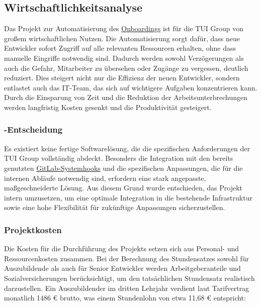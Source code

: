 \subsection{Wirtschaftlichkeitsanalyse}
\label{sec:Wirtschaftlichkeitsanalyse}

Das Projekt zur Automatisierung des \hyperlink{Onboarding}{\textcolor{AOBlau}{Onboardings}} ist für die TUI Group von großem wirtschaftlichen Nutzen. Die Automatisierung sorgt dafür, dass neue Entwickler sofort Zugriff auf alle relevanten Ressourcen erhalten, ohne dass manuelle Eingriffe notwendig sind. Dadurch werden sowohl Verzögerungen als auch die Gefahr, Mitarbeiter zu übersehen oder Zugänge zu vergessen, deutlich reduziert. Dies steigert nicht nur die Effizienz der neuen Entwickler, sondern entlastet auch das IT-Team, das sich auf wichtigere Aufgaben konzentrieren kann. Durch die Einsparung von Zeit und die Reduktion der Arbeitsunterbrechungen werden langfristig Kosten gesenkt und die Produktivität gesteigert.

\subsubsection{-Entscheidung}
\label{sec:MakeOrBuyEntscheidung}

Es existiert keine fertige Softwarelösung, die die spezifischen Anforderungen der TUI Group vollständig abdeckt. Besonders die Integration mit den bereits genutzten \hyperlink{GitLabSystemHooks}{\textcolor{AOBlau}{GitLab-Systemhooks}} und die spezifischen Anpassungen, die für die internen Abläufe notwendig sind, erfordern eine stark angepasste, maßgeschneiderte Lösung. Aus diesem Grund wurde entschieden, das Projekt intern umzusetzen, um eine optimale Integration in die bestehende Infrastruktur sowie eine hohe Flexibilität für zukünftige Anpassungen sicherzustellen.

\subsubsection{Projektkosten}
\label{sec:Projektkosten}

Die Kosten für die Durchführung des Projekts setzen sich aus Personal- und Ressourcenkosten zusammen. Bei der Berechnung des Stundensatzes sowohl für Auszubildende als auch für Senior Entwickler werden Arbeitgeberanteile und Sozialversicherungen berücksichtigt, um den tatsächlichen Stundensatz realistisch darzustellen.
\newline
Ein Auszubildender im dritten Lehrjahr verdient laut Tarifvertrag monatlich 1486 € brutto, was einem Stundenlohn von etwa 11,68 € entspricht:

